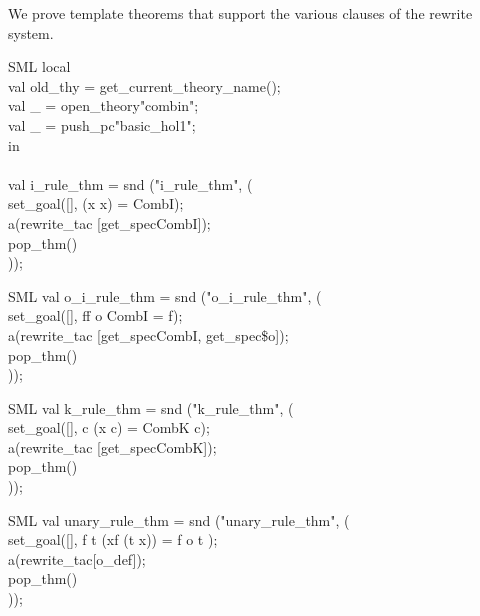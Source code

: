 \documentclass[11pt,a4paper]{article}
\begin{document}
We prove template theorems that support the various clauses of the rewrite system.
\begin{GFT}{SML}
\+local \\
\+	val old\_thy = get\_current\_theory\_name();\\
\+	val \_ = open\_theory"combin";\\
\+	val \_ = push\_pc"basic\_hol1";\\
\+in\\
\+\\
\+val \PrNL{}i\_rule\_thm\PrNN{} = snd ("i\_rule\_thm", (\\
\+set\_goal([], \PrKM{}(\PrMM{}x\PrLH{} x) = CombI\PrKO{});\\
\+a(rewrite\_tac [get\_spec\PrKM{}CombI\PrKO{}]);\\
\+pop\_thm()\\
\+));\\
\end{GFT}

\begin{GFT}{SML}
\+val \PrNL{}o\_i\_rule\_thm\PrNN{} = snd ("o\_i\_rule\_thm", (\\
\+set\_goal([], \PrKM{}\PrLF{}f\PrLH{}f o CombI = f\PrKO{});\\
\+a(rewrite\_tac [get\_spec\PrKM{}CombI\PrKO{}, get\_spec\PrKM{}\$o\PrKO{}]);\\
\+pop\_thm()\\
\+));\\
\end{GFT}

\begin{GFT}{SML}
\+val \PrNL{}k\_rule\_thm\PrNN{} = snd ("k\_rule\_thm", (\\
\+set\_goal([], \PrKM{}\PrLF{}c\PrLH{} (\PrMM{}x\PrLH{} c) = CombK c\PrKO{});\\
\+a(rewrite\_tac [get\_spec\PrKM{}CombK\PrKO{}]);\\
\+pop\_thm()\\
\+));\\
\end{GFT}

\begin{GFT}{SML}
\+val \PrNL{}unary\_rule\_thm\PrNN{} = snd ("unary\_rule\_thm", (\\
\+set\_goal([], \PrKM{} \PrLF{}f t\PrLH{} (\PrMM{}x\PrLH{}f (t x)) = f o t \PrKO{});\\
\+a(rewrite\_tac[o\_def]);\\
\+pop\_thm()\\
\+));\\
\end{GFT}
\end{document}
